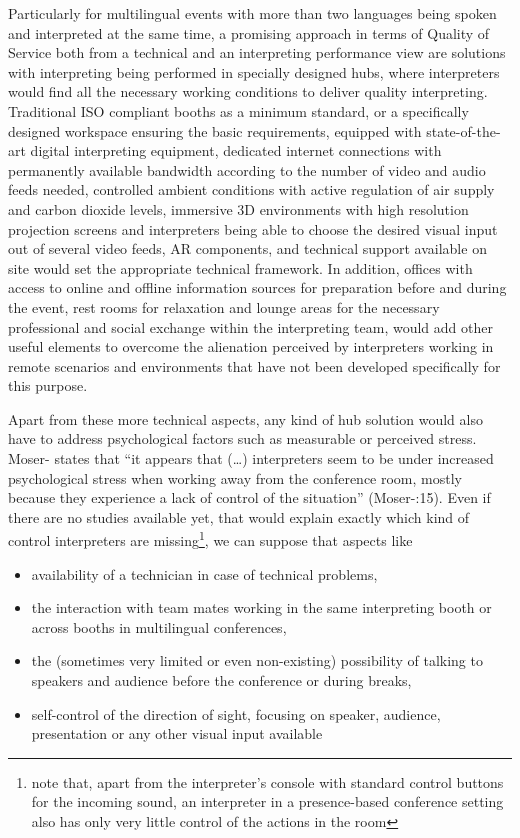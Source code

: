 \documentclass[output=paper]{langsci/langscibook}
\begin{document}
Particularly for multilingual events with more than two languages being spoken and interpreted at the same time, a promising approach in terms of Quality of Service both from a technical and an interpreting performance view are solutions with interpreting being performed in specially designed hubs, where interpreters would find all the necessary working conditions to deliver quality interpreting. Traditional ISO compliant booths as a minimum standard, or a specifically designed workspace ensuring the basic requirements, equipped with state-of-the-art digital interpreting equipment, dedicated internet connections with permanently available bandwidth according to the number of video and audio feeds needed, controlled ambient conditions with active regulation of air supply and carbon dioxide levels, immersive 3D environments with high resolution projection screens and interpreters being able to choose the desired visual input out of several video feeds, AR components, and technical support available on site would set the appropriate technical framework. In addition, offices with access to online and offline information sources for preparation before and during the event, rest rooms for relaxation and lounge areas for the necessary professional and social exchange within the interpreting team, would add other useful elements to overcome the alienation perceived by interpreters working in remote scenarios and environments that have not been developed specifically for this purpose. 

Apart from these more technical aspects, any kind of hub solution would also have to address psychological factors such as measurable or perceived stress. Moser-\citet{Mercer2005} states that “it appears that (…) interpreters seem to be under increased psychological stress when working away from the conference room, mostly because they experience a lack of control of the situation” (Moser-\citealt{Mercer2005}:15). Even if there are no studies available yet, that would explain exactly which kind of control interpreters are missing\footnote{note that, apart from the interpreter’s console with standard control buttons for the incoming sound, an interpreter in a presence-based conference setting also has only very little control of the actions in the room}, we can suppose that aspects like

\begin{itemize}
\item availability of a technician in case of technical problems,
\item the interaction with team mates working in the same interpreting booth or across booths in multilingual conferences,
\item the (sometimes very limited or even non-existing) possibility of talking to speakers and audience before the conference or during breaks,
\item self-control of the direction of sight, focusing on speaker, audience, presentation or any other visual input available
\end{itemize}
\end{document}
